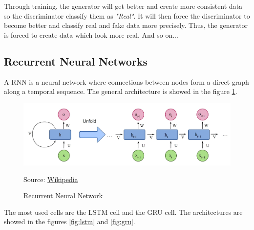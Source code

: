 \documentclass[12pt]{report}
\begin{document}
Through training, the generator will get better and create more consistent data so the discriminator classify them as \textit{"Real"}.
It will then force the discriminator to become better and classify real and fake data more precisely.
Thus, the generator is forced to create data which look more real.
And so on...

\subsection{Recurrent Neural Networks}
\label{sec:back:rnn}

A RNN is a neural network where connections between nodes form a direct graph along a temporal sequence. The general architecture is showed in the figure \ref{fig:rnn}.

\begin{figure}[htbp]
    \centering
    \includegraphics[width=0.75 \textwidth]{images/nn/architectures/rnn.jpg}
    \caption{Recurrent Neural Network}
    Source: \href{https://fr.wikipedia.org/wiki/Fichier:Recurrent_neural_network_unfold.svg}{Wikipedia}
    \label{fig:rnn}
\end{figure}

The most used cells are the LSTM cell and the GRU cell. The architectures are showed in the figures \ref{fig:lstm} and \ref{fig:gru}.
\end{document}
